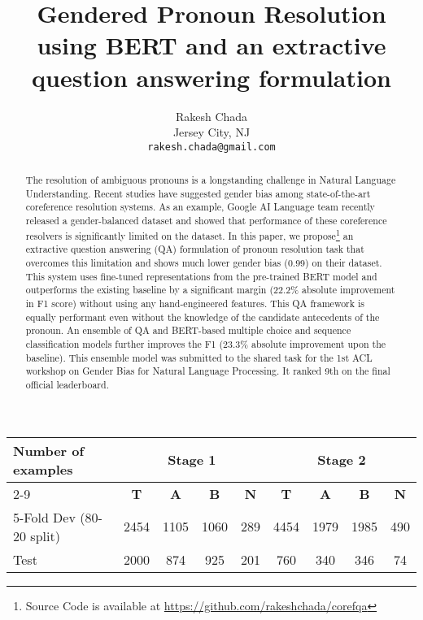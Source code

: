 \documentclass[11pt,a4paper]{article}
\title{Gendered Pronoun Resolution using BERT and an extractive question answering formulation}
\author{Rakesh Chada \\
  Jersey City, NJ \\
  \texttt{rakesh.chada@gmail.com} \\}
\date{}
\begin{document}
\maketitle
\begin{abstract}
    The resolution of ambiguous pronouns is a longstanding challenge in Natural Language Understanding. Recent studies have suggested gender bias among state-of-the-art coreference resolution systems. As an example, Google AI Language team recently released a gender-balanced dataset and showed that performance of these coreference resolvers is significantly limited on the dataset. In this paper, we propose\footnote{Source Code is available at \url{https://github.com/rakeshchada/corefqa}} an extractive question answering (QA) formulation of pronoun resolution task that overcomes this limitation and shows much lower gender bias (0.99) on their dataset. This system uses fine-tuned representations from the pre-trained BERT model and outperforms the existing baseline by a significant margin (22.2\% absolute improvement in F1 score) without using any hand-engineered features. This QA framework is equally performant even without the knowledge of the candidate antecedents of the pronoun. An ensemble of QA and BERT-based multiple choice and sequence classification models further improves the F1 (23.3\% absolute improvement upon the baseline). This ensemble model was submitted to the shared task for the 1st ACL workshop on Gender Bias for Natural Language Processing. It ranked 9th on the final official leaderboard.
\end{abstract}

\begin{table*}[!ht]
  \centering
  \renewcommand{\arraystretch}{1.2}
  \begin{tabular}{|p{5cm}|c|c|c|c|c|c|c|c|}
    \hline
    \multirow{2}{5cm}{\textbf{Number of examples}} & \multicolumn{4}{c|}{\textbf{Stage 1}} & \multicolumn{4}{c|}{\textbf{Stage 2}}\\
\cline{2-9}
    & \textbf{T} & \textbf{A} & \textbf{B} & \textbf{N} & \textbf{T} & \textbf{A} & \textbf{B} & \textbf{N}\\
\hline
    5-Fold Dev (80-20 split) & 2454 & 1105 & 1060 & 289 & 4454 & 1979 & 1985 & 490 \\ \hline
    Test & 2000 & 874 & 925 & 201 & 760 & 340 & 346 & 74  \\ \hline
  \end{tabular}
  \caption{\label{stats-table} Stage 1 and Stage 2 Dataset statistics.}
\end{table*}
\end{document}
